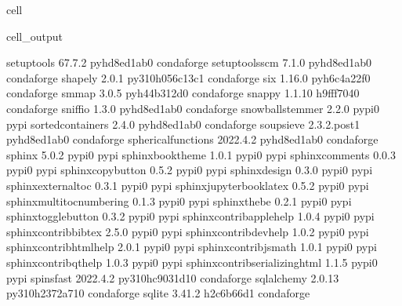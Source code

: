 \documentclass[letterpaper,table,10pt,english]{jupyterBook}
\begin{document}
\begin{sphinxuseclass}{cell}
\begin{sphinxVerbatimOutput}
\begin{sphinxuseclass}{cell_output}
\begin{sphinxVerbatim}[commandchars=\\\{\}]
setuptools                67.7.2             pyhd8ed1ab\PYGZus{}0    conda\PYGZhy{}forge
setuptools\PYGZhy{}scm            7.1.0              pyhd8ed1ab\PYGZus{}0    conda\PYGZhy{}forge
shapely                   2.0.1           py310h056c13c\PYGZus{}1    conda\PYGZhy{}forge
six                       1.16.0             pyh6c4a22f\PYGZus{}0    conda\PYGZhy{}forge
smmap                     3.0.5              pyh44b312d\PYGZus{}0    conda\PYGZhy{}forge
snappy                    1.1.10               h9fff704\PYGZus{}0    conda\PYGZhy{}forge
sniffio                   1.3.0              pyhd8ed1ab\PYGZus{}0    conda\PYGZhy{}forge
snowballstemmer           2.2.0                    pypi\PYGZus{}0    pypi
sortedcontainers          2.4.0              pyhd8ed1ab\PYGZus{}0    conda\PYGZhy{}forge
soupsieve                 2.3.2.post1        pyhd8ed1ab\PYGZus{}0    conda\PYGZhy{}forge
spherical\PYGZus{}functions       2022.4.2           pyhd8ed1ab\PYGZus{}0    conda\PYGZhy{}forge
sphinx                    5.0.2                    pypi\PYGZus{}0    pypi
sphinx\PYGZhy{}book\PYGZhy{}theme         1.0.1                    pypi\PYGZus{}0    pypi
sphinx\PYGZhy{}comments           0.0.3                    pypi\PYGZus{}0    pypi
sphinx\PYGZhy{}copybutton         0.5.2                    pypi\PYGZus{}0    pypi
sphinx\PYGZhy{}design             0.3.0                    pypi\PYGZus{}0    pypi
sphinx\PYGZhy{}external\PYGZhy{}toc       0.3.1                    pypi\PYGZus{}0    pypi
sphinx\PYGZhy{}jupyterbook\PYGZhy{}latex  0.5.2                    pypi\PYGZus{}0    pypi
sphinx\PYGZhy{}multitoc\PYGZhy{}numbering 0.1.3                    pypi\PYGZus{}0    pypi
sphinx\PYGZhy{}thebe              0.2.1                    pypi\PYGZus{}0    pypi
sphinx\PYGZhy{}togglebutton       0.3.2                    pypi\PYGZus{}0    pypi
sphinxcontrib\PYGZhy{}applehelp   1.0.4                    pypi\PYGZus{}0    pypi
sphinxcontrib\PYGZhy{}bibtex      2.5.0                    pypi\PYGZus{}0    pypi
sphinxcontrib\PYGZhy{}devhelp     1.0.2                    pypi\PYGZus{}0    pypi
sphinxcontrib\PYGZhy{}htmlhelp    2.0.1                    pypi\PYGZus{}0    pypi
sphinxcontrib\PYGZhy{}jsmath      1.0.1                    pypi\PYGZus{}0    pypi
sphinxcontrib\PYGZhy{}qthelp      1.0.3                    pypi\PYGZus{}0    pypi
sphinxcontrib\PYGZhy{}serializinghtml 1.1.5                    pypi\PYGZus{}0    pypi
spinsfast                 2022.4.2        py310hc9031d1\PYGZus{}0    conda\PYGZhy{}forge
sqlalchemy                2.0.13          py310h2372a71\PYGZus{}0    conda\PYGZhy{}forge
sqlite                    3.41.2               h2c6b66d\PYGZus{}1    conda\PYGZhy{}forge

\end{sphinxVerbatim}
\end{sphinxuseclass}
\end{sphinxVerbatimOutput}
\end{sphinxuseclass}
\end{document}
